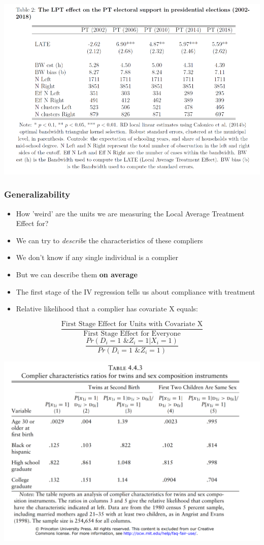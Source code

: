 \documentclass[xcolor=x11names,compress]{beamer}\usepackage[]{graphicx}\usepackage[]{color}
\renewcommand{\(}{\begin{columns}}
\renewcommand{\)}{\end{columns}}
\newcommand{\<}[1]{\begin{column}{#1}}
\renewcommand{\>}{\end{column}}
\begin{document}
\begin{frame}
\includegraphics[width=\linewidth]{placebo.png}
\end{frame}

\begin{frame}
\frametitle{Generalizability}
\begin{itemize}
\item How 'weird' are the units we are measuring the Local Average Treatment Effect for?
\pause
\item We can try to \textit{describe} the characteristics of these compliers
\pause
\item We don't know if any single individual is a complier
\pause
\item But we can describe them \textbf{on average}
\pause
\item The first stage of the IV regression tells us about compliance with treatment
\pause
\item Relative likelihood that a complier has covariate X equals:
\end{itemize}
\pause
$$\frac{\text{First Stage Effect for Units with Covariate X}}{\text{First Stage Effect for Everyone}}$$
\pause
$$\frac{Pr(D_i=1\text{ \& }Z_i=1 | X_i=1)}{Pr(D_i=1\text{ \& }Z_i=1)}$$
\end{frame}

\begin{frame}
\includegraphics[width=\linewidth]{twins_compliers.png}
\end{frame}
\end{document}
